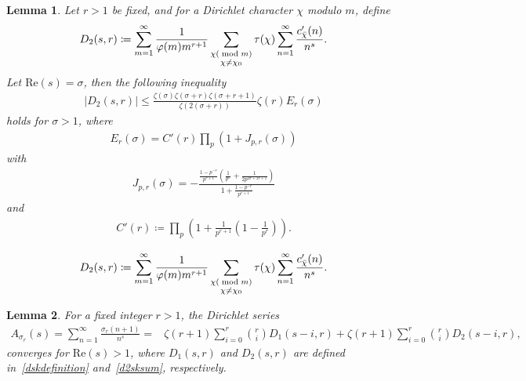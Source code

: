 \documentclass[10pt,a4paper]{amsart}
\newtheorem{lemma}{Lemma}
\begin{document}
\begin{lemma}\label{gausssumlemma}
Let $r>1$ be fixed, and for a Dirichlet character $\chi$ modulo $m$, define
\begin{align}\label{d2sksum}
D_2(s,r)
\coloneqq\sum_{m=1}^{\infty}\frac{1}{\varphi(m)m^{r+1}}\sum_{\substack{\chi(\bmod{m})\\\chi\ne\chi_0}}\tau(\chi)\sum_{n=1}^{\infty}\frac{c'_{\Bar{\chi}}(n)}{n^{s}}.
\end{align}
\noindent
Let $\mathrm{Re}(s)=\sigma$, then the following inequality
\begin{align*}
|D_2(s,r)|
\leq\frac{\zeta(\sigma)\zeta(\sigma+r)\zeta(\sigma+r+1)}{\zeta(2(\sigma+r))}\zeta(r)E_r(\sigma)
\end{align*}
holds for $\sigma>1$, where
\begin{align}\label{erdefinition}
E_r(\sigma)
=C'(r)\prod_{p}(1+J_{p,r}(\sigma))
\end{align}
with
\begin{align*}
J_{p,r}(\sigma)
=-\frac{\frac{1-p^{-r}}{p^{r+1}}\left(\frac{1}{p^{\sigma}}+\frac{1}{2p^{2\sigma+2r+1}}\right)}{1+\frac{1-p^{-r}}{p^{r+1}}}
\end{align*}
and
\begin{align}\label{cprimerdefinition}
C'(r)
\coloneqq\prod_{p}\left(1+\frac{1}{p^{r+1}}\left(1-\frac{1}{p^r}\right)\right).
\end{align}
\end{lemma}

\begin{align}
D_2(s,r)
\coloneqq\sum_{m=1}^{\infty}\frac{1}{\varphi(m)m^{r+1}}\sum_{\substack{\chi(\bmod{m})\\\chi\ne\chi_0}}\tau(\chi)\sum_{n=1}^{\infty}\frac{c'_{\Bar{\chi}}(n)}{n^{s}}.
\end{align}

\begin{lemma}\label{shfiteddirichletseries}
For a fixed integer $r>1$, the Dirichlet series
\begin{align*}
A_{\sigma_r}(s)
=\sum_{n=1}^{\infty}\frac{\sigma_r(n+1)}{n^s}
=&\zeta(r+1)\sum_{i=0}^{r}\binom{r}{i}D_1(s-i,r)+\zeta(r+1)\sum_{i=0}^{r}\binom{r}{i}D_2(s-i,r),
\end{align*}
converges for $\mathrm{Re}(s)>1$, where $D_1(s,r)$ and $D_2(s,r)$ are defined in~\eqref{dskdefinition} and~\eqref{d2sksum}, respectively.
\end{lemma}
\end{document}
